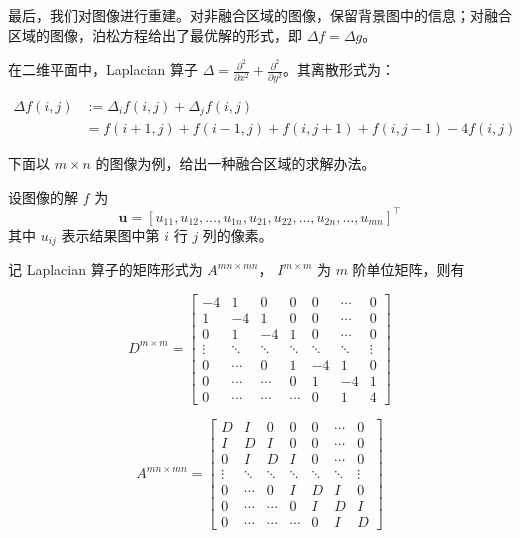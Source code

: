 \documentclass[lang=cn,11pt,a4paper]{elegantpaper}
\begin{document}
最后，我们对图像进行重建。对非融合区域的图像，保留背景图中的信息；对融合区域的图像，泊松方程给出了最优解的形式，即 $\Delta f = \Delta g$。

在二维平面中，Laplacian 算子 $\Delta = \frac{\partial^{2}}{\partial x^{2}}+\frac{\partial^{2}}{\partial y^{2}}$。其离散形式为：

\begin{equation}
\begin{aligned}
\Delta f(i, j) &:=\Delta_{i} f(i, j)+\Delta_{j} f(i, j) \\
&=f(i+1, j)+f(i-1, j)+f(i, j+1)+f(i, j-1)-4 f(i, j)
\end{aligned}
\end{equation}

下面以 $m \times n$ 的图像为例，给出一种融合区域的求解办法。

设图像的解 $f$ 为
\begin{equation}
\mathbf{u} = [u_{11}, u_{12}, \dots, u_{1n}, u_{21}, u_{22}, \dots, u_{2n}, \dots, u_{mn} ]^\top
\end{equation}
其中 $u_{ij}$ 表示结果图中第 $i$ 行 $j$ 列的像素。

记 Laplacian 算子的矩阵形式为 $A^{mn \times mn}$， $I^{m\times m}$ 为 $m$ 阶单位矩阵，则有

\begin{equation}
D^{m \times m}=\left[\begin{array}{ccccccc}
-4 & 1 & 0 & 0 & 0 & \cdots & 0 \\
1 & -4 & 1 & 0 & 0 & \cdots & 0 \\
0 & 1 & -4 & 1 & 0 & \cdots & 0 \\
\vdots & \ddots & \ddots & \ddots & \ddots & \ddots & \vdots \\
0 & \cdots & 0 & 1 & -4 & 1 & 0 \\
0 & \cdots & \cdots & 0 & 1 & -4 & 1 \\
0 & \cdots & \cdots & \cdots & 0 & 1 & 4
\end{array}\right]
\end{equation}

\begin{equation}
A^{mn \times mn}=\left[\begin{array}{ccccccc}
D & I & 0 & 0 & 0 & \cdots & 0 \\
I & D & I & 0 & 0 & \cdots & 0 \\
0 & I & D & I & 0 & \cdots & 0 \\
\vdots & \ddots & \ddots & \ddots & \ddots & \ddots & \vdots \\
0 & \cdots & 0 & I & D & I & 0 \\
0 & \cdots & \cdots & 0 & I & D & I \\
0 & \cdots & \cdots & \cdots & 0 & I & D
\end{array}\right]
\end{equation}
\end{document}
